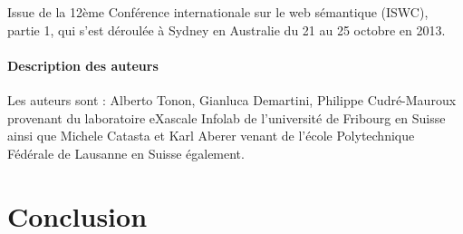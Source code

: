 \documentclass{article}
\begin{document}
Issue de la 12ème Conférence internationale sur le web sémantique (ISWC), partie 1, qui s’est déroulée à Sydney en Australie du 21 au 25 octobre en 2013.


\paragraph{Description des auteurs}

Les auteurs sont :
Alberto Tonon, Gianluca Demartini, Philippe Cudré-Mauroux provenant du laboratoire eXascale Infolab de l'université de Fribourg en Suisse ainsi que Michele Catasta et Karl Aberer venant de l'école Polytechnique Fédérale de Lausanne en Suisse également.




\section{Conclusion}








\end{document}
